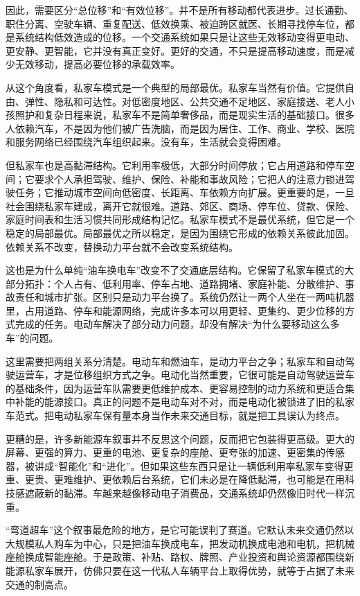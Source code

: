 因此，需要区分“总位移”和“有效位移”。并不是所有移动都代表进步。过长通勤、职住分离、空驶车辆、重复配送、低效换乘、被迫跨区就医、长期寻找停车位，都是系统结构低效造成的位移。一个交通系统如果只是让这些无效移动变得更电动、更安静、更智能，它并没有真正变好。更好的交通，不只是提高移动速度，而是减少无效移动，提高必要位移的承载效率。

从这个角度看，私家车模式是一个典型的局部最优。私家车当然有价值。它提供自由、弹性、隐私和可达性。对低密度地区、公共交通不足地区、家庭接送、老人小孩照护和复杂日程来说，私家车不是简单奢侈品，而是现实生活的基础接口。很多人依赖汽车，不是因为他们被广告洗脑，而是因为居住、工作、商业、学校、医院和服务网络已经围绕汽车组织起来。没有车，生活就会变得困难。

但私家车也是高黏滞结构。它利用率极低，大部分时间停放；它占用道路和停车空间；它要求个人承担驾驶、维护、保险、补能和事故风险；它把人的注意力锁进驾驶任务；它推动城市空间向低密度、长距离、车依赖方向扩展。更重要的是，一旦社会围绕私家车建成，离开它就很难。道路、郊区、商场、停车位、贷款、保险、家庭时间表和生活习惯共同形成结构记忆。私家车模式不是最优系统，但它是一个稳定的局部最优。局部最优之所以稳定，是因为围绕它形成的依赖关系彼此加固。依赖关系不改变，替换动力平台就不会改变系统结构。


这也是为什么单纯“油车换电车”改变不了交通底层结构。它保留了私家车模式的大部分拓扑：个人占有、低利用率、停车占地、道路拥堵、家庭补能、分散维护、事故责任和城市扩张。区别只是动力平台换了。系统仍然让一两个人坐在一两吨机器里，占用道路、停车和能源网络，完成许多本可以用更轻、更集约、更少位移的方式完成的任务。电动车解决了部分动力问题，却没有解决“为什么要移动这么多车”的问题。

这里需要把两组关系分清楚。电动车和燃油车，是动力平台之争；私家车和自动驾驶运营车，才是位移组织方式之争。电动化当然重要，它很可能是自动驾驶运营车的基础条件，因为运营车队需要更低维护成本、更容易控制的动力系统和更适合集中补能的能源接口。真正的问题不是电动车对不对，而是电动化被锁进了旧的私家车范式。把电动私家车保有量本身当作未来交通目标，就是把工具误认为终点。

更糟的是，许多新能源车叙事并不反思这个问题，反而把它包装得更高级。更大的屏幕、更强的算力、更重的电池、更复杂的座舱、更夸张的加速、更密集的传感器，被讲成“智能化”和“进化”。但如果这些东西只是让一辆低利用率私家车变得更重、更贵、更难维护、更依赖后台系统，它们未必是在降低黏滞，也可能是在用科技感遮蔽新的黏滞。车越来越像移动电子消费品，交通系统却仍然像旧时代一样沉重。

“弯道超车”这个叙事最危险的地方，是它可能误判了赛道。它默认未来交通仍然以大规模私人购车为中心，只是把油车换成电车，把发动机换成电池和电机，把机械座舱换成智能座舱。于是政策、补贴、路权、牌照、产业投资和舆论资源都围绕新能源私家车展开，仿佛只要在这一代私人车辆平台上取得优势，就等于占据了未来交通的制高点。

